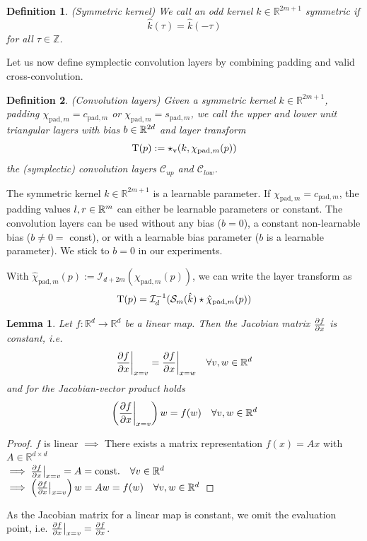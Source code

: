 \documentclass[twoside,a4paper]{article}
\newtheorem{definition}{Definition}
\newtheorem{lemma}{Lemma}
\begin{document}
\begin{definition}
	(Symmetric kernel)
	We call an odd kernel $k \in \mathbb{R}^{2m+1}$ symmetric if
	\begin{equation*}
		\hat{k}(\tau) = \hat{k}(-\tau)
	\end{equation*}
	for all $\tau \in \mathbb{Z}$.
\end{definition}

Let us now define symplectic convolution layers by combining padding and valid 
cross-convolution.
\begin{definition}\label{def_conv_layer}
	(Convolution layers)
	Given a symmetric kernel $k \in \mathbb{R}^{2m+1}$, padding
	$\chi_{\text{pad},m} = c_{\text{pad},m}$ or $\chi_{\text{pad},m} = s_{\text{pad},m}$,
	we call the upper and lower unit triangular layers with bias $b \in \mathbb{R}^{2d}$ and layer transform
	\begin{equation*}
		\mathrm{T}(p) := \star_{\text{v}}(k,\chi_{\text{pad},m}(p))
	\end{equation*}
	the (symplectic) convolution layers $\mathcal{C}_{up}$ and $\mathcal{C}_{low}$.
\end{definition}
The symmetric kernel $k \in \mathbb{R}^{2m+1}$ is a learnable parameter.
If $\chi_{\text{pad},m} = c_{\text{pad},m}$, the padding values $l,r \in \mathbb{R}^m$ can either
be learnable parameters or constant. The convolution layers can be used without any bias ($b=0$), a
constant non-learnable bias ($b \neq 0 =$ const), or with a learnable bias parameter 
($b$ is a learnable parameter). We stick to $b=0$ in our experiments.

With $\hat{\chi}_{\text{pad},m}(p) := \mathcal{I}_{d+2m}(\chi_{\text{pad},m}(p))$,
we can write the layer transform as
\begin{equation}\label{eq_conv_layer_transform}
	\mathrm{T}(p) =
	\mathcal{I}_{d}^{-1} (
		\mathcal{S}_{m}(\hat{k}) \star \hat{\chi}_{\text{pad},m}(p)
	)
\end{equation}

\begin{lemma}\label{jac_linear_map}
	Let $f: \mathbb{R}^d \to \mathbb{R}^d$ be a linear map. Then the Jacobian matrix
	$\frac{\partial f}{\partial x}$ is constant, i.e.
	\begin{equation*}
		\frac{\partial f}{\partial x} \bigg|_{x = v} = \frac{\partial f}{\partial x} \bigg|_{x = w} \quad \forall v,w \in \mathbb{R}^d
	\end{equation*}
	and for the Jacobian-vector product holds
	\begin{equation*}
		\left( \frac{\partial f}{\partial x} \bigg|_{x = v} \right) w = f(w) \quad \forall v,w \in \mathbb{R}^d
	\end{equation*}
\end{lemma}
\begin{proof}
	$f$ is linear $\implies$ There exists a matrix representation $f(x) = Ax$ with
	$A \in \mathbb{R}^{d \times d}$ \\
	$\implies \frac{\partial f}{\partial x} \big|_{x=v} = A = \text{const.} \quad \forall v \in \mathbb{R}^d$
	$\implies \left( \frac{\partial f}{\partial x} \big|_{x=v} \right) w = Aw = f(w) \quad \forall v,w \in \mathbb{R}^d$
\end{proof}
As the Jacobian matrix for a linear map is constant, we omit the evaluation point, i.e.
$\frac{\partial f}{\partial x} \big|_{x=v} = \frac{\partial f}{\partial x}$.
\end{document}
